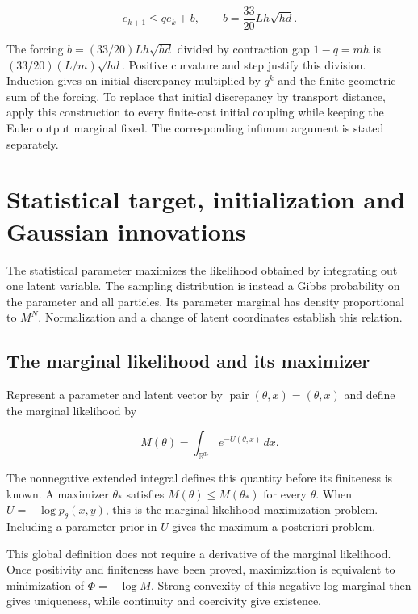 \documentclass[11pt,a4paper]{article}
\begin{document}
\[e_{k+1}\le q e_k+b,\qquad b=\frac{33}{20}Lh\sqrt{hd}.\]

The forcing \(b=(33/20)Lh\sqrt{hd}\) divided by contraction gap \(1-q=mh\) is \((33/20)(L/m)\sqrt{hd}\). Positive curvature and step justify this division. Induction gives an initial discrepancy multiplied by \(q^k\) and the finite geometric sum of the forcing. To replace that initial discrepancy by transport distance, apply this construction to every finite-cost initial coupling while keeping the Euler output marginal fixed. The corresponding infimum argument is stated separately.




\section{\texorpdfstring{Statistical target, initialization and Gaussian innovations}{Statistical target, initialization and Gaussian innovations}}


The statistical parameter maximizes the likelihood obtained by integrating out one latent variable. The sampling distribution is instead a Gibbs probability on the parameter and all particles. Its parameter marginal has density proportional to \(M^N\). Normalization and a change of latent coordinates establish this relation.



\subsection{\texorpdfstring{The marginal likelihood and its maximizer}{The marginal likelihood and its maximizer}}


Represent a parameter and latent vector by \(\operatorname{pair}(\theta,x)=(\theta,x)\) and define the marginal likelihood by

\[M(\theta)=\int_{\mathbb R^{d_x}}e^{-U(\theta,x)}\,dx.\]

The nonnegative extended integral defines this quantity before its finiteness is known. A maximizer \(\theta_*\) satisfies \(M(\theta)\le M(\theta_*)\) for every \(\theta\). When \(U=-\log p_\theta(x,y)\), this is the marginal-likelihood maximization problem. Including a parameter prior in \(U\) gives the maximum a posteriori problem.



This global definition does not require a derivative of the marginal likelihood. Once positivity and finiteness have been proved, maximization is equivalent to minimization of \(\Phi=-\log M\). Strong convexity of this negative log marginal then gives uniqueness, while continuity and coercivity give existence.
\end{document}
